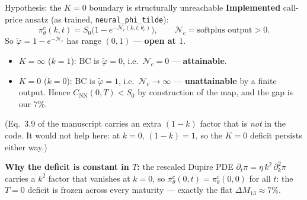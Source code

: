\documentclass[aspectratio=169,11pt]{beamer}
\begin{document}
\begin{frame}{Hypothesis: the $K\!=\!0$ boundary is structurally unreachable}
    \small
    \textbf{Implemented} call-price ansatz (as trained, \texttt{neural\_phi\_tilde}):
    \[
        \pi^c_\theta(k,t) = S_0\bigl(1 - e^{-\mathcal{N}_c(k,t;\theta_c)}\bigr),
        \qquad \mathcal{N}_c = \text{softplus output} > 0 .
    \]
    So $\tilde\varphi = 1-e^{-\mathcal{N}_c}$ has range $(0,1)$ --- \textbf{open at $1$}.
    \begin{itemize}\setlength{\itemsep}{0.2em}
        \item $K=\infty$ ($k=1$): BC is $\tilde\varphi=0$, i.e.\ $\mathcal{N}_c=0$
              --- \textbf{attainable}.
        \item $K=0$ ($k=0$): BC is $\tilde\varphi=1$, i.e.\ $\mathcal{N}_c\to\infty$
              --- \textbf{unattainable} by a finite output. Hence
              $C_{\mathrm{NN}}(0,T) < S_0$ by construction of the map, and the gap is our $7\%$.
    \end{itemize}
    {\footnotesize (Eq.~3.9 of the manuscript carries an extra $(1-k)$ factor that is
    \emph{not} in the code. It would not help here: at $k=0$, $(1-k)=1$, so the $K=0$
    deficit persists either way.)}
    \vspace{0.2em}

    \textbf{Why the deficit is constant in $T$:} the rescaled Dupire PDE
    $\partial_t\pi = \eta\,k^2\,\partial^2_k\pi$ carries a $k^2$ factor that vanishes
    at $k=0$, so $\pi^c_\theta(0,t)=\pi^c_\theta(0,0)$ for all $t$: the $T=0$ deficit
    is frozen across every maturity --- exactly the flat $\Delta M_{13}\!\approx\!7\%$.
\end{frame}
\end{document}
